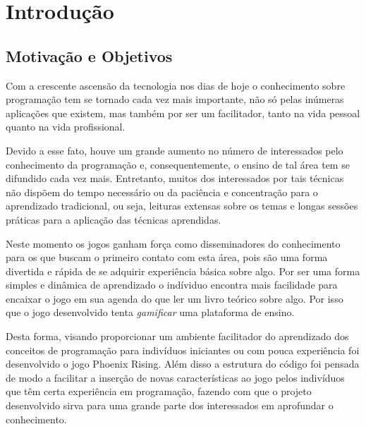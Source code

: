 
\chapter{Introdução}
\label{cap:introducao}

\section{Motivação e Objetivos}

Com a crescente ascensão da tecnologia nos dias de hoje o conhecimento sobre
programação tem se tornado cada vez mais importante, não só pelas inúmeras
aplicações que existem, mas também por ser um facilitador, tanto na vida
pessoal quanto na vida profissional.

Devido a esse fato, houve um grande aumento no número de interessados pelo
conhecimento da programação e, consequentemente, o ensino de tal área tem se
difundido cada vez mais. Entretanto, muitos dos interessados por tais técnicas
não dispõem do tempo necessário ou da paciência e concentração para o 
aprendizado tradicional, ou seja, leituras extensas sobre os temas e longas 
sessões práticas para a aplicação das técnicas aprendidas.

Neste momento os jogos ganham força como disseminadores do conhecimento para os 
que buscam o primeiro contato com esta área, pois são
uma forma divertida e rápida de se adquirir experiência básica sobre algo.
Por ser uma forma simples e dinâmica de aprendizado o indíviduo encontra mais
facilidade para encaixar o jogo em sua agenda do que ler um livro teórico sobre
algo. Por isso que o jogo desenvolvido tenta \textit{gamificar} uma plataforma 
de ensino.

Desta forma, visando proporcionar um ambiente facilitador do aprendizado dos
conceitos de programação para indivíduos iniciantes ou com pouca experiência
foi desenvolvido o jogo Phoenix Rising. Além disso a estrutura do código foi
pensada de modo a facilitar a inserção de novas características ao jogo
pelos indivíduos que têm certa experiência em programação, fazendo com que
o projeto desenvolvido sirva para uma grande parte dos interessados em 
aprofundar o conhecimento.


